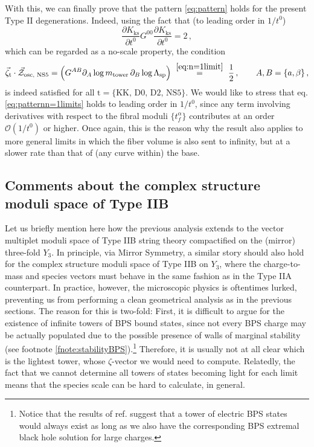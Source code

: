With this, we can finally prove that the pattern \eqref{eq:pattern} holds for the present Type II degenerations. Indeed, using the fact that (to leading order in $1/t^0$)
%
\begin{equation}\label{eq:noscalen=1}
	\frac{\partial K_{\text{ks}}}{\partial t^0} G^{0 0} \frac{\partial K_{\text{ks}}}{\partial t^0} = 2\, ,
\end{equation}
%
which can be regarded as a no-scale property, the condition
%
\begin{equation}\label{eq:patternn=1limits}
	\vec{\zeta}_{\text{t}} \cdot\vec{\mathcal{Z}}_{\text{osc, NS5}}=\left(G^{A B}\partial_{A}\log m_{\text{tower}}\,\partial_{B}\log \Lambda_{\rm sp}\right) \stackrel{~\eqref{eq:n=1limit}~}{=} \frac{1}{2}\, , \qquad A, B= \lbrace a, \beta \rbrace\, ,
\end{equation}
%
is indeed satisfied for all $\text{t}= \lbrace \text{KK, D0, D2, NS5} \rbrace$. We would like to stress that eq. \eqref{eq:patternn=1limits} holds to leading order in $1/t^0$, since any term involving derivatives with respect to the fibral moduli $\{t_f^{\alpha}\}$ contributes at an order $\mathcal{O}\left(1/t^0\right)$ or higher. Once again, this is the reason why the result also applies to more general limits in which the fiber volume is also sent to infinity, but at a slower rate than that of (any curve within) the base.
	
\subsection{Comments about the complex structure moduli space of Type IIB}
\label{ss:commentsTypeIIB}
	
Let us briefly mention here how the previous analysis extends to the vector multiplet moduli space of Type IIB string theory compactified on the (mirror) three-fold $Y_3$. In principle, via Mirror Symmetry, a similar story should also hold for the complex structure moduli space of Type IIB on $Y_3$, where the charge-to-mass and species vectors must behave in the same fashion as in the Type IIA counterpart. In practice, however, the microscopic physics is oftentimes lurked, preventing us from performing a clean geometrical analysis as in the previous sections. The reason for this is two-fold: First, it is difficult to argue for the existence of infinite towers of BPS bound states, since not every BPS charge may be actually populated due to the possible presence of walls of marginal stability (see footnote \ref{fnote:stabilityBPS}).\footnote{Notice that the results of ref. \cite{Palti:2021ubp} suggest that a tower of electric BPS states would always exist as long as we also have the corresponding BPS extremal black hole solution for large charges.} Therefore, it is usually not at all clear which is the lightest tower, whose $\zeta$-vector we would need to compute. Relatedly, the fact that we cannot determine all towers of states becoming light for each limit means that the species scale can be hard to calculate, in general.
	
